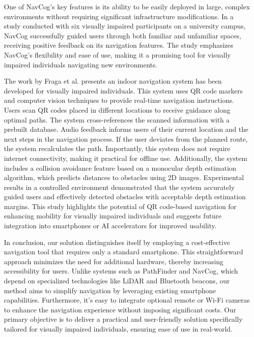 One of NavCog's key features is its ability to be easily deployed in large, complex environments without requiring significant infrastructure modifications. In a study conducted with six visually impaired participants on a university campus, NavCog successfully guided users through both familiar and unfamiliar spaces, receiving positive feedback on its navigation features. The study emphasizes NavCog’s flexibility and ease of use, making it a promising tool for visually impaired individuals navigating new environments.


The work by Fraga et al. \cite{fraga2022} presents an indoor navigation system has been developed for visually impaired individuals. This system uses QR code markers and computer vision techniques to provide real-time navigation instructions. Users scan QR codes placed in different locations to receive guidance along optimal paths. The system cross-references the scanned information with a prebuilt database. Audio feedback informs users of their current location and the next steps in the navigation process. If the user deviates from the planned route, the system recalculates the path. Importantly, this system does not require internet connectivity, making it practical for offline use. Additionally, the system includes a collision avoidance feature based on a monocular depth estimation algorithm, which predicts distances to obstacles using 2D images. Experimental results in a controlled environment demonstrated that the system accurately guided users and effectively detected obstacles with acceptable depth estimation margins. This study highlights the potential of QR code-based navigation for enhancing mobility for visually impaired individuals and suggests future integration into smartphones or AI accelerators for improved usability.


In conclusion, our solution distinguishes itself by employing a cost-effective navigation tool that requires only a standard smartphone. This straightforward approach minimizes the need for additional hardware, thereby increasing accessibility for users. Unlike systems such as PathFinder and NavCog, which depend on specialized technologies like LiDAR and Bluetooth beacons, our method aims to simplify navigation by leveraging existing smartphone capabilities. Furthermore, it's easy to integrate optional remote or Wi-Fi cameras to enhance the navigation experience without imposing significant costs. Our primary objective is to deliver a practical and user-friendly solution specifically tailored for visually impaired individuals, ensuring ease of use in real-world.



